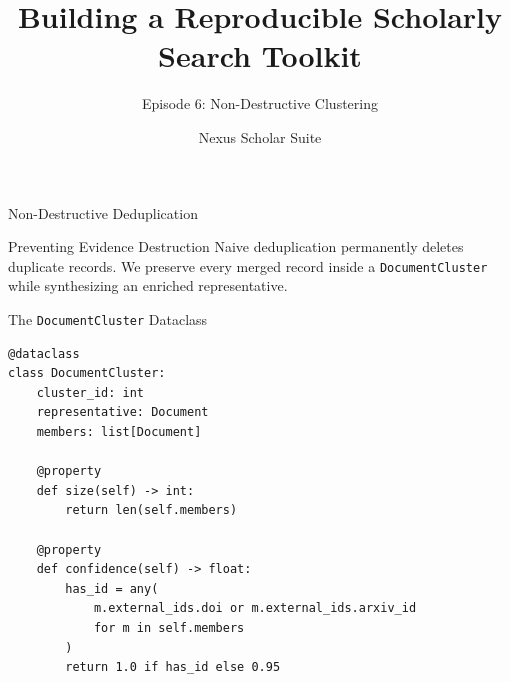 \documentclass[aspectratio=169]{beamer}
\title{Building a Reproducible Scholarly Search Toolkit}
\subtitle{Episode 6: Non-Destructive Clustering}
\author{Nexus Scholar Suite}
\date{}
\begin{document}
\begin{frame}[plain]
  \titlepage
\end{frame}

\begin{frame}{Non-Destructive Deduplication}
  \begin{alertblock}{Preventing Evidence Destruction}
    Naive deduplication permanently deletes duplicate records. We preserve every merged record inside a \texttt{DocumentCluster} while synthesizing an enriched representative.
  \end{alertblock}
  \vspace{0.3cm}
  \begin{center}
  \end{center}
\end{frame}

\begin{frame}[fragile]{The \texttt{DocumentCluster} Dataclass}
\begin{lstlisting}[style=nexuspython]
@dataclass
class DocumentCluster:
    cluster_id: int
    representative: Document
    members: list[Document]

    @property
    def size(self) -> int:
        return len(self.members)

    @property
    def confidence(self) -> float:
        has_id = any(
            m.external_ids.doi or m.external_ids.arxiv_id 
            for m in self.members
        )
        return 1.0 if has_id else 0.95
\end{lstlisting}
\end{frame}
\end{document}
